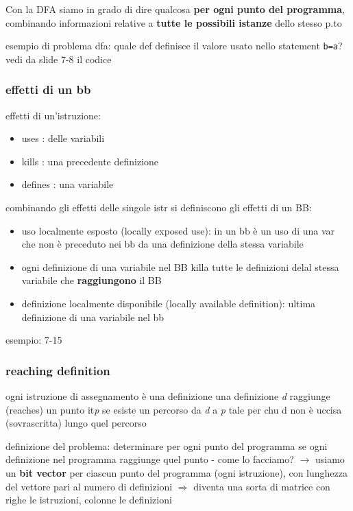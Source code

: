 Con la DFA siamo in grado di dire qualcosa \textbf{per ogni punto del programma}, combinando informazioni relative a \textbf{tutte le possibili istanze} dello stesso p.to

esempio di problema dfa: quale def definisce il valore usato nello statement \lstinline|b=a|? vedi da slide 7-8 il codice

\subsubsection{effetti di un bb}

effetti di un'istruzione:
\begin{itemize}
  \item uses : delle variabili
  \item kills : una precedente definizione
  \item defines : una variabile
\end{itemize}
combinando gli effetti delle singole istr si definiscono gli effetti di un BB:
\begin{itemize}
  \item uso localmente esposto (locally exposed use): in un bb \`e un uso di una var che non \`e preceduto nei bb da una definizione della stessa variabile
  \item ogni definizione di una variabile nel BB killa tutte le definizioni delal stessa variabile che \textbf{raggiungono} il BB
  \item definizione localmente disponibile (locally available definition): ultima definizione di una variabile nel bb
\end{itemize}

esempio: 7-15

\subsubsection{reaching definition}

ogni istruzione di assegnamento \`e una definizione
una definizione \textit{d} raggiunge (reaches) un punto it\textit{p} se esiste un percorso da \textit{d} a \textit{p} tale per chu d non \`e uccisa (sovrascritta) lungo quel percorso

definizione del problema: determinare per ogni punto del programma se ogni definizione nel programma raggiunge quel punto - come lo facciamo? $\rightarrow$ usiamo un \textbf{bit vector} per ciascun punto del programma (ogni istruzione), con lunghezza del vettore pari al numero di definizioni $\Rightarrow$ diventa una sorta di matrice con righe le istruzioni, colonne le definizioni

